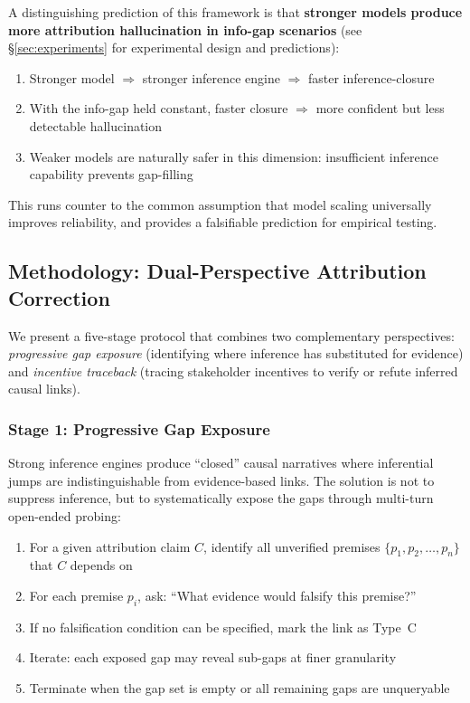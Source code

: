 A distinguishing prediction of this framework is that \textbf{stronger models 
produce more attribution hallucination in info-gap scenarios} (see 
\S\ref{sec:experiments} for experimental design and predictions):

\begin{enumerate}
  \item Stronger model $\Rightarrow$ stronger inference engine $\Rightarrow$ faster inference-closure
  \item With the info-gap held constant, faster closure $\Rightarrow$ more confident but less detectable hallucination
  \item Weaker models are naturally safer in this dimension: insufficient inference capability prevents gap-filling
\end{enumerate}

This runs counter to the common assumption that model scaling universally 
improves reliability, and provides a falsifiable prediction for empirical testing.

\subsection{Methodology: Dual-Perspective Attribution Correction}

We present a five-stage protocol that combines two complementary perspectives: 
\textit{progressive gap exposure} (identifying where inference has substituted 
for evidence) and \textit{incentive traceback} (tracing stakeholder incentives 
to verify or refute inferred causal links).

\subsubsection{Stage 1: Progressive Gap Exposure}

Strong inference engines produce ``closed'' causal narratives where inferential 
jumps are indistinguishable from evidence-based links. The solution is not to 
suppress inference, but to systematically expose the gaps through multi-turn 
open-ended probing:

\begin{enumerate}
  \item For a given attribution claim $C$, identify all unverified premises 
        $\{p_1, p_2, \ldots, p_n\}$ that $C$ depends on
  \item For each premise $p_i$, ask: ``What evidence would falsify this premise?''
  \item If no falsification condition can be specified, mark the link as Type~C
  \item Iterate: each exposed gap may reveal sub-gaps at finer granularity
  \item Terminate when the gap set is empty or all remaining gaps are unqueryable
\end{enumerate}

